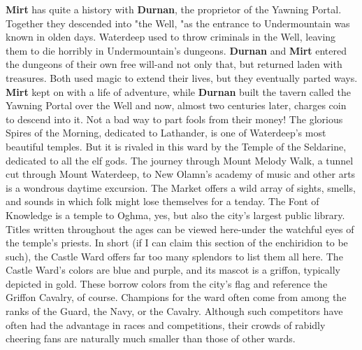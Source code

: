 \documentclass[10pt,a4paper,twoside,twocolumn,openany,nodeprecatedcode]{dndbook}
\begin{document}
\textbf{Mirt} has quite a history with \textbf{Durnan}, the proprietor of the Yawning Portal. Together they descended into "the Well, "as the entrance to Undermountain was known in olden days. Waterdeep used to throw criminals in the Well, leaving them to die horribly in Undermountain's dungeons. \textbf{Durnan} and \textbf{Mirt} entered the dungeons of their own free will-and not only that, but returned laden with treasures. Both used magic to extend their lives, but they eventually parted ways. \textbf{Mirt} kept on with a life of adventure, while \textbf{Durnan} built the tavern called the Yawning Portal over the Well and now, almost two centuries later, charges coin to descend into it. Not a bad way to part fools from their money!
The glorious Spires of the Morning, dedicated to Lathander, is one of Waterdeep's most beautiful temples. But it is rivaled in this ward by the Temple of the Seldarine, dedicated to all the elf gods. The journey through Mount Melody Walk, a tunnel cut through Mount Waterdeep, to New Olamn's academy of music and other arts is a wondrous daytime excursion. The Market offers a wild array of sights, smells, and sounds in which folk might lose themselves for a tenday. The Font of Knowledge is a temple to Oghma, yes, but also the city's largest public library. Titles written throughout the ages can be viewed here-under the watchful eyes of the temple's priests. In short (if I can claim this section of the enchiridion to be such), the Castle Ward offers far too many splendors to list them all here.
The Castle Ward's colors are blue and purple, and its mascot is a griffon, typically depicted in gold. These borrow colors from the city's flag and reference the Griffon Cavalry, of course. Champions for the ward often come from among the ranks of the Guard, the Navy, or the Cavalry. Although such competitors have often had the advantage in races and competitions, their crowds of rabidly cheering fans are naturally much smaller than those of other wards.
\end{document}
